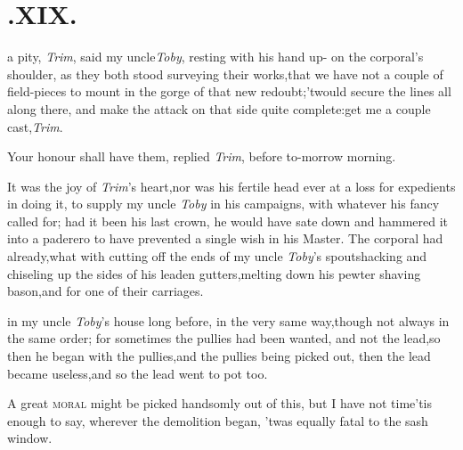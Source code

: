 \documentclass{article}
\begin{document}
\section{.\enspace  XIX.}

 a pity, \textit{Trim}, said
my uncle\break \textit{Toby}, resting with his hand up-\break
on the corporal’s shoulder, as they both stood surveying their
works,\tsk that we have not a couple of field-pieces to mount in
the gorge of that new redoubt;\tsk ’twould secure the lines
all along there, and make the attack on that side quite
complete:\tsh get me a couple cast,\break \textit{Trim}.

Your honour shall have them, replied \textit{Trim}, before
to-morrow morning.

It was the joy of \textit{Trim}’s heart,\tsk nor was his fertile head
ever at a loss for expedients in doing it, to supply my uncle
\textit{Toby} in his campaigns, with whatever his fancy called for; had
it been his last crown, he would have sate down and hammered it into a
paderero to have prevented a single wish in his Master. The corporal
had already,\tsk what with cutting off the ends of my uncle
\textit{Toby}’s spouts\tsk hacking and chiseling up the sides of his
leaden gutters,\tsk melting down his pewter shaving bason,\tsk and
for one of their carriages.

\break in my uncle
\textit{Toby}’s house long before, in the very same
way,\tsk though not always in the same order; for sometimes the\break
pullies had been wanted, and not the lead,\tsk so then he began
with the pullies,\break\tsk and the pullies being picked out, then the
lead became useless,\tsk and so the lead went to pot too.

\tsh  A great \textsc{moral} might be picked
handsomly out of this, but I have not time\tsk ’tis enough
to say, wherever the demolition began, ’twas equally fatal to
the sash window.
\end{document}
